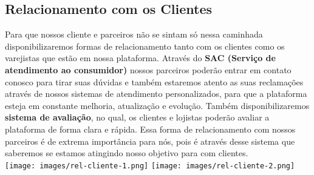 \documentclass[a4paper]{article}
\begin{document}
\subsection{Relacionamento com os Clientes}
\par Para que nossos cliente e parceiros não se sintam só nessa caminhada disponibilizaremos formas de relacionamento tanto com os clientes como os varejistas que estão em nossa plataforma. Através do \textbf{SAC (Serviço de atendimento ao consumidor)} nossos parceiros poderão entrar em contato conosco para tirar suas dúvidas e também estaremos atento as suas reclamações através de nossos sistemas de atendimento personalizados, para que a plataforma esteja em constante melhoria, atualização e evolução. Também disponibilizaremos \textbf{sistema de avaliação}, no qual, os clientes e lojistas poderão avaliar a plataforma de forma clara e rápida. Essa forma de relacionamento com nossos parceiros é de extrema importância para nós, pois é através desse sistema que saberemos se estamos atingindo nosso objetivo para com clientes.\\
\texttt{[image: images/rel-cliente-1.png]}
\texttt{[image: images/rel-cliente-2.png]}
\end{document}
